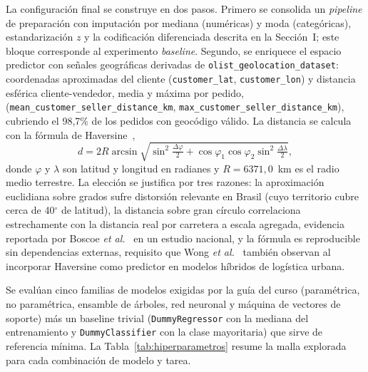 \documentclass[journal]{IEEEtran}
\begin{document}
La configuración final se construye en dos pasos. Primero se consolida un \emph{pipeline} de preparación con imputación por mediana (numéricas) y moda (categóricas), estandarización $z$ y la codificación diferenciada descrita en la Sección~I; este bloque corresponde al experimento \emph{baseline}. Segundo, se enriquece el espacio predictor con señales geográficas derivadas de \texttt{olist\_geolocation\_dataset}: coordenadas aproximadas del cliente (\texttt{customer\_lat}, \texttt{customer\_lon}) y distancia esférica cliente-vendedor, media y máxima por pedido, (\texttt{mean\_customer\_seller\_distance\_km}, \texttt{max\_customer\_seller\_distance\_km}), cubriendo el 98,7\% de los pedidos con geocódigo válido. La distancia se calcula con la fórmula de Haversine~\cite{sinnott1984},
\begin{equation}
d=2R\arcsin\!\sqrt{\sin^2\!\tfrac{\Delta\varphi}{2}+\cos\varphi_1\cos\varphi_2\sin^2\!\tfrac{\Delta\lambda}{2}},
\label{eq:haversine}
\end{equation}
donde $\varphi$ y $\lambda$ son latitud y longitud en radianes y $R=6371{,}0$~km es el radio medio terrestre. La elección se justifica por tres razones: la aproximación euclidiana sobre grados sufre distorsión relevante en Brasil (cuyo territorio cubre cerca de 40$^\circ$ de latitud), la distancia sobre gran círculo correlaciona estrechamente con la distancia real por carretera a escala agregada, evidencia reportada por Boscoe \emph{et al.}~\cite{boscoe2012} en un estudio nacional, y la fórmula es reproducible sin dependencias externas, requisito que Wong \emph{et al.}~\cite{wong2026} también observan al incorporar Haversine como predictor en modelos híbridos de logística urbana.

Se evalúan cinco familias de modelos exigidas por la guía del curso (paramétrica, no paramétrica, ensamble de árboles, red neuronal y máquina de vectores de soporte) más un baseline trivial (\texttt{DummyRegressor} con la mediana del entrenamiento y \texttt{DummyClassifier} con la clase mayoritaria) que sirve de referencia mínima. La Tabla~\ref{tab:hiperparametros} resume la malla explorada para cada combinación de modelo y tarea.
\end{document}

